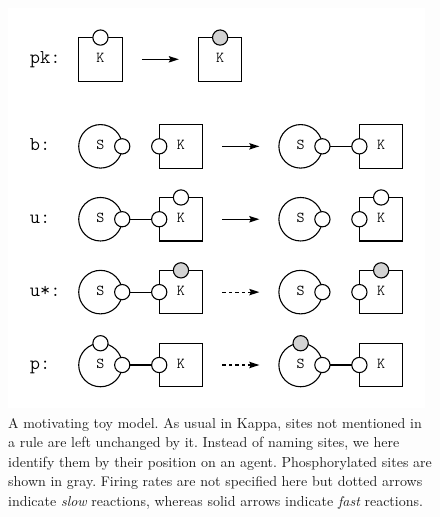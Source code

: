 \begin{figure}[!h]
  \vskip -0.1cm
  \begin{center}
    \includegraphics[scale=0.9]{figures/model.pdf}
  \end{center}
  \vskip -0.2cm
  \caption{A motivating toy model. As usual in Kappa, sites not
    mentioned in a rule are left unchanged by it. Instead of naming
    sites, we here identify them by their position on an
    agent. Phosphorylated sites are shown in gray. Firing rates are
    not specified here but dotted arrows indicate \textit{slow}
    reactions, whereas solid arrows indicate \textit{fast} reactions.}
  \label{fig:model}
\end{figure}

